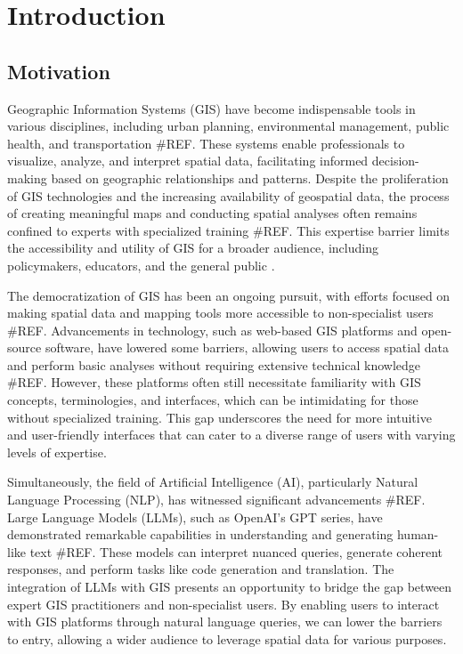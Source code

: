 
%

\chapter{Introduction}
\label{cha:introduction}

\section{Motivation}


Geographic Information Systems (GIS) have become indispensable tools in various disciplines, including urban planning, environmental management, public health, and transportation \#REF. These systems enable professionals to visualize, analyze, and interpret spatial data, facilitating informed decision-making based on geographic relationships and patterns. Despite the proliferation of GIS technologies and the increasing availability of geospatial data, the process of creating meaningful maps and conducting spatial analyses often remains confined to experts with specialized training \#REF. This expertise barrier limits the accessibility and utility of GIS for a broader audience, including policymakers, educators, and the general public \cite{haklay_neogeography_2013}.

The democratization of GIS has been an ongoing pursuit, with efforts focused on making spatial data and mapping tools more accessible to non-specialist users \#REF. Advancements in technology, such as web-based GIS platforms and open-source software, have lowered some barriers, allowing users to access spatial data and perform basic analyses without requiring extensive technical knowledge \#REF. However, these platforms often still necessitate familiarity with GIS concepts, terminologies, and interfaces, which can be intimidating for those without specialized training. This gap underscores the need for more intuitive and user-friendly interfaces that can cater to a diverse range of users with varying levels of expertise.

Simultaneously, the field of Artificial Intelligence (AI), particularly Natural Language Processing (NLP), has witnessed significant advancements \#REF. Large Language Models (LLMs), such as OpenAI's GPT series, have demonstrated remarkable capabilities in understanding and generating human-like text \#REF. These models can interpret nuanced queries, generate coherent responses, and perform tasks like code generation and translation. The integration of LLMs with GIS presents an opportunity to bridge the gap between expert GIS practitioners and non-specialist users. By enabling users to interact with GIS platforms through natural language queries, we can lower the barriers to entry, allowing a wider audience to leverage spatial data for various purposes.

